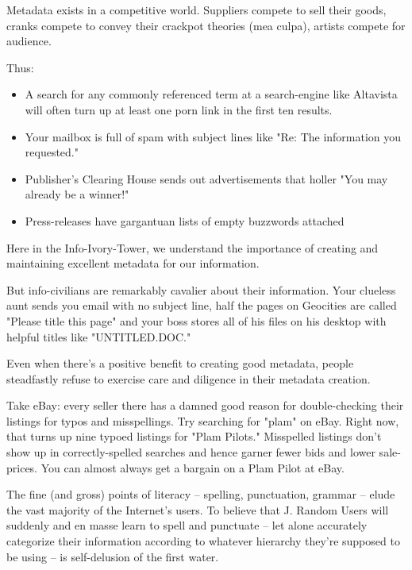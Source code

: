 \documentclass[a4paper,landscape,headrule,footrule,xetex]{foils}
\begin{document}

Metadata exists in a competitive world. Suppliers compete to sell
their goods, cranks compete to convey their crackpot theories (mea
culpa), artists compete for audience.

Thus:
\begin{itemize}
\item    A search for any commonly referenced term at a search-engine like Altavista will often turn up at least one porn link in the first ten results.
\item     Your mailbox is full of spam with subject lines like "Re: The information you requested."
\item     Publisher's Clearing House sends out advertisements that holler "You may already be a winner!"
\item     Press-releases have gargantuan lists of empty buzzwords attached
\end{itemize}


Here in the Info-Ivory-Tower, we understand the importance of creating
and maintaining excellent metadata for our information.

But info-civilians are remarkably cavalier about their
information. Your clueless aunt sends you email with no subject line,
half the pages on Geocities are called "Please title this page" and
your boss stores all of his files on his desktop with helpful titles
like "UNTITLED.DOC."


Even when there's a positive benefit to creating good metadata, people
steadfastly refuse to exercise care and diligence in their metadata
creation.

Take eBay: every seller there has a damned good reason for
double-checking their listings for typos and misspellings. Try
searching for "plam" on eBay. Right now, that turns up nine typoed
listings for "Plam Pilots." Misspelled listings don't show up in
correctly-spelled searches and hence garner fewer bids and lower
sale-prices. You can almost always get a bargain on a Plam Pilot at
eBay.

The fine (and gross) points of literacy -- spelling, punctuation,
grammar -- elude the vast majority of the Internet's users. To believe
that J. Random Users will suddenly and en masse learn to spell and
punctuate -- let alone accurately categorize their information
according to whatever hierarchy they're supposed to be using -- is
self-delusion of the first water.
\end{document}
